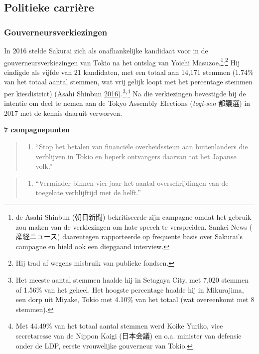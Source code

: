 \documentclass[10.5pt,dutch,]{article}
\providecommand{\tightlist}{%
  \setlength{\itemsep}{0pt}\setlength{\parskip}{0pt}}
\begin{document}
\subsection{Politieke carrière}\label{politieke-carriuxe8re}

\subsubsection{Gouverneursverkiezingen}\label{gouverneursverkiezingen}

In 2016 stelde Sakurai zich als onafhankelijke kandidaat voor in de
gouverneursverkiezingen van Tokio na het ontslag van Yoichi
Masuzoe.\footnote{de Asahi Shinbun (朝日新聞) bekritiseerde zijn campagne
  omdat het gebruik zou maken van de verkiezingen om hate speech te
  verspreiden. Sankei News ( 産経ニュース) daarentegen rapporteerde op
  frequente basis over Sakurai's campagne en hield ook een diepgaand
  interview.}$^{,}$\footnote{Hij trad af wegens misbruik van publieke
  fondsen.} Hij eindigde als vijfde van 21 kandidaten, met een totaal
aan 14,171 stemmen (1.74\% van het totaal aantal stemmen, wat vrij
gelijk loopt met het percentage stemmen per kiesdistrict) (Asahi Shinbun
\protect\hyperlink{ref-asahiux5fshimbunux5felectionsux5f2016}{2016}).\footnote{Het
  meeste aantal stemmen haalde hij in Setagaya City, met 7,020 stemmen
  of 1.56\% van het geheel. Het hoogste percentage haalde hij in
  Mikurajima, een dorp uit Miyake, Tokio met 4.10\% van het totaal (wat
  overeenkomt met 8 stemmen).}$^{,}$\footnote{Met 44.49\% van het totaal
  aantal stemmen werd Koike Yuriko, vice secretaresse van de Nippon
  Kaigi (日本会議) en o.a. minister van defensie onder de LDP, eerste
  vrouwelijke gouverneur van Tokio.} Na
die verkiezingen bevestigde hij de intentie om deel te nemen aan de
Tokyo Assembly Elections (\emph{togi-sen} 都議選) in 2017 met de kennis
daaruit verworven.

\textbf{7 campagnepunten}

\begin{quote}
\begin{enumerate}
\def\labelenumi{\arabic{enumi}.}
\tightlist
\item
  ``Stop het betalen van financiële overheidssteun aan buitenlanders die
  verblijven in Tokio en beperk ontvangers daarvan tot het Japanse
  volk.''
\end{enumerate}
\end{quote}

\begin{quote}
\begin{enumerate}
\def\labelenumi{\arabic{enumi}.}
\setcounter{enumi}{1}
\tightlist
\item
  ``Verminder binnen vier jaar het aantal overschrijdingen van de
  toegelate verblijftijd met de helft.''
\end{enumerate}
\end{quote}
\end{document}
